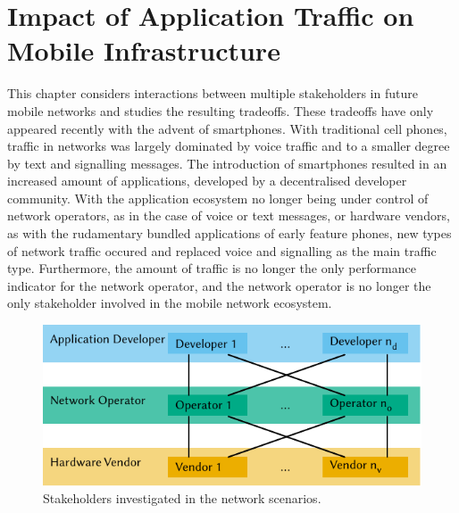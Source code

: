 \chapter{Impact of Application Traffic on Mobile Infrastructure}\label{chap:network}

\newcommand{\TFACH}{\ensuremath{T_{\text{FACH}}}}
\newcommand{\TDCH}{\ensuremath{T_{\text{DCH}}}}

This chapter considers interactions between multiple stakeholders in future mobile networks and studies the resulting tradeoffs.
These tradeoffs have only appeared recently with the advent of smartphones.
With traditional cell phones, traffic in networks was largely dominated by voice traffic and to a smaller degree by text and signalling messages.
The introduction of smartphones resulted in an increased amount of applications, developed by a decentralised developer community.
With the application ecosystem no longer being under control of network operators, as in the case of voice or text messages, or hardware vendors, as with the rudamentary bundled applications of early feature phones, new types of network traffic occured and replaced voice and signalling as the main traffic type.
Furthermore, the amount of traffic is no longer the only performance indicator for the network operator, and the network operator is no longer the only stakeholder involved in the mobile network ecosystem.

\begin{figure}
  \centering
  \includegraphics{network/figures/stakeholders}
  \caption{Stakeholders investigated in the network scenarios.}
  \label{fig:network:stakeholders}
\end{figure}

